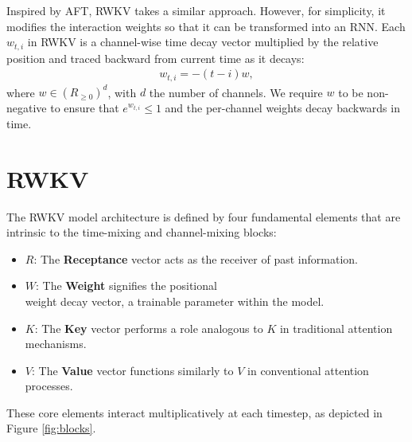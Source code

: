 \documentclass[11pt]{article}
\begin{document}
Inspired by AFT, RWKV takes a similar approach. However, for simplicity, it modifies the interaction weights so that it can be transformed into an RNN. Each $w_{t,i}$ in RWKV is a channel-wise time decay vector multiplied by the relative position and traced backward from current time as it decays:
\begin{align}
    w_{t,i} = -(t-i)w,
\end{align}
where $w\in (R_{\geq 0})^{d}$, with $d$ the number of channels. We require $w$ to be non-negative to ensure that $e^{w_{t,i}} \le 1$ and the per-channel weights decay backwards in time.





\section{RWKV} %
\label{rwkv_model}



The RWKV model architecture is defined by four fundamental elements that are intrinsic to the time-mixing and channel-mixing blocks:
\begin{itemize}
    \item $R$: The \textbf{Receptance} vector acts as the receiver of past information.
    \item $W$: The \textbf{Weight} signifies the positional \\ weight decay vector, a trainable parameter within the model.
    \item $K$: The \textbf{Key} vector performs a role analogous to $K$ in traditional attention mechanisms. 
    \item $V$: The \textbf{Value} vector functions similarly to $V$ in conventional attention processes.
\end{itemize}
These core elements interact multiplicatively at each timestep, as depicted in Figure \ref{fig:blocks}.
\end{document}
